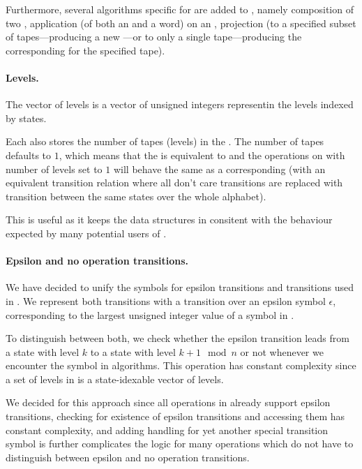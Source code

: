 Furthermore, several algorithms specific for \nfts are added to \mata, namely composition of two \nfts, application (of both an \nfa and a word) on an \nft, projection (to a specified subset of \nft tapes---producing a new \nft---or to only a single tape---producing the corresponding \nfa for the specified tape).

\paragraph{Levels.}
The vector of levels is a vector of unsigned integers representin the levels indexed by states.

Each \nft also stores the number of tapes (levels) in the \nft.
The number of tapes defaults to $1$, which means that the \nft is equivalent to \nfa and the operations on \nfts with number of levels set to $1$ will behave the same as a corresponding \nfa (with an equivalent transition relation where all don't care transitions are replaced with transition between the same states over the whole alphabet).

This is useful as it keeps the data structures in \mata consitent with the behaviour expected by many potential users of \mata.

\paragraph{Epsilon and no operation transitions.}
We have decided to unify the symbols for epsilon transitions and \nop transitions used in \mata.
We represent both transitions with a transition over an epsilon symbol $\epsilon$, corresponding to the largest unsigned integer value of a symbol in \mata.

To distinguish between both, we check whether the epsilon transition leads from a state with level $k$ to a state with level $k + 1 \mod n$ or not whenever we encounter the symbol in algorithms.
This operation has constant complexity since a set of levels in \mata is a state-idexable vector of levels.

We decided for this approach since all operations in \mata already support epsilon transitions, checking for existence of epsilon transitions and accessing them has constant complexity, and adding handling for yet another special transition symbol is further complicates the logic for many operations which do not have to distinguish between epsilon and no operation transitions.

